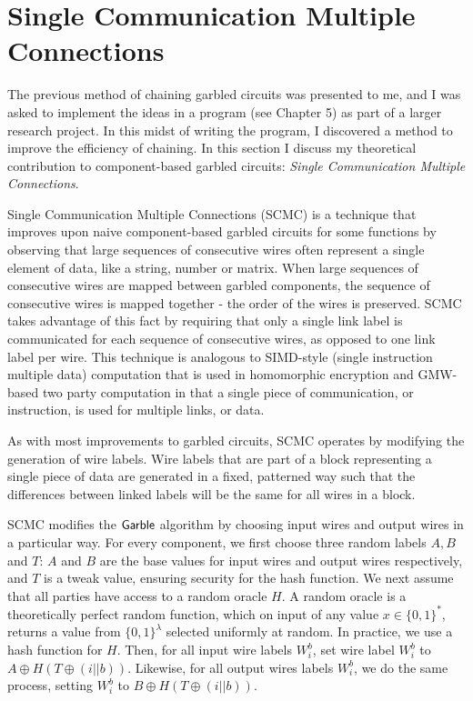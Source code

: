 \section{Single Communication Multiple Connections}

The previous method of chaining garbled circuits was presented to me, and I was asked to implement the ideas in a program (see Chapter 5) as part of a larger research project. 
In this midst of writing the program, I discovered a method to improve the efficiency of chaining. 
In this section I discuss my theoretical contribution to component-based garbled circuits:  \textit{Single Communication Multiple Connections}.

Single Communication Multiple Connections (SCMC) is a technique that improves upon naive component-based garbled circuits for some functions by observing that large sequences of consecutive wires often represent a single element of data, like a string, number or matrix. 
When large sequences of consecutive wires are mapped between garbled components, the sequence of consecutive wires is mapped together - the order of the wires is preserved. 
SCMC takes advantage of this fact by requiring that only a single link label is communicated for each sequence of consecutive wires, as opposed to one link label per wire. 
This technique is analogous to SIMD-style (single instruction multiple data) computation that is used in homomorphic encryption \cite{SV11} and GMW-based two party computation \cite{DSZ15, SZ13} in that a single piece of communication, or instruction, is used for multiple links, or data. 

As with most improvements to garbled circuits, SCMC operates by modifying the generation of wire labels. 
Wire labels that are part of a block representing a single piece of data are generated in a fixed, patterned way such that the differences between linked labels will be the same for all wires in a block. 

SCMC modifies the $\sf{Garble}$ algorithm by choosing input wires and output wires in a particular way. 
For every component, we first choose three random labels $A,B$ and $T$: $A$ and $B$ are the base values for input wires and output wires respectively, and $T$ is a tweak value, ensuring security for the hash function.
We next assume that all parties have access to a random oracle $H$. 
A random oracle is a theoretically perfect random function, which on input of any value $x \in \{0,1\}^*$, returns a value from $\{0,1\}^{\lambda}$ selected uniformly at random.
In practice, we use a hash function for $H$. 
Then, for all input wire labels $W_i^b$, set wire label $W_i^b$ to $A \oplus H(T \oplus (i || b))$. 
Likewise, for all output wires labels $W_i^b$, we do the same process, setting $W_i^b$ to $B \oplus H(T \oplus (i || b))$.

